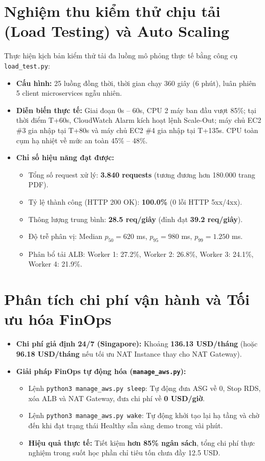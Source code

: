 \documentclass[12pt,a4paper]{report}
\begin{document}
\section{Nghiệm thu kiểm thử chịu tải (Load Testing) và Auto Scaling}
Thực hiện kịch bản kiểm thử tải đa luồng mô phỏng thực tế bằng công cụ \texttt{load\_test.py}:
\begin{itemize}
    \item \textbf{Cấu hình:} 25 luồng đồng thời, thời gian chạy 360 giây (6 phút), luân phiên 5 client microservices ngẫu nhiên.
    \item \textbf{Diễn biến thực tế:} Giai đoạn 0s -- 60s, CPU 2 máy ban đầu vượt 85\%; tại thời điểm T+60s, CloudWatch Alarm kích hoạt lệnh Scale-Out; máy chủ EC2 \#3 gia nhập tại T+80s và máy chủ EC2 \#4 gia nhập tại T+135s. CPU toàn cụm hạ nhiệt về mức an toàn 45\% -- 48\%.
    \item \textbf{Chỉ số hiệu năng đạt được:}
    \begin{itemize}
        \item Tổng số request xử lý: \textbf{3.840 requests} (tương đương hơn 180.000 trang PDF).
        \item Tỷ lệ thành công (HTTP 200 OK): \textbf{100.0\%} (0 lỗi HTTP 5xx/4xx).
        \item Thông lượng trung bình: \textbf{28.5 req/giây} (đỉnh đạt \textbf{39.2 req/giây}).
        \item Độ trễ phân vị: Median $p_{50} = 620$ ms, $p_{95} = 980$ ms, $p_{99} = 1.250$ ms.
        \item Phân bổ tải ALB: Worker 1: 27.2\%, Worker 2: 26.8\%, Worker 3: 24.1\%, Worker 4: 21.9\%.
    \end{itemize}
\end{itemize}

\section{Phân tích chi phí vận hành và Tối ưu hóa FinOps}
\begin{itemize}
    \item \textbf{Chi phí giả định 24/7 (Singapore):} Khoảng \textbf{136.13 USD/tháng} (hoặc \textbf{96.18 USD/tháng} nếu tối ưu NAT Instance thay cho NAT Gateway).
    \item \textbf{Giải pháp FinOps tự động hóa (\texttt{manage\_aws.py}):}
    \begin{itemize}
        \item Lệnh \texttt{python3 manage\_aws.py sleep}: Tự động đưa ASG về 0, Stop RDS, xóa ALB và NAT Gateway, đưa chi phí về \textbf{0 USD/giờ}.
        \item Lệnh \texttt{python3 manage\_aws.py wake}: Tự động khởi tạo lại hạ tầng và chờ đến khi đạt trạng thái Healthy sẵn sàng demo trong vài phút.
        \item \textbf{Hiệu quả thực tế:} Tiết kiệm \textbf{hơn 85\% ngân sách}, tổng chi phí thực nghiệm trong suốt học phần chỉ tiêu tốn chưa đầy 12.5 USD.
    \end{itemize}
\end{itemize}
\end{document}
